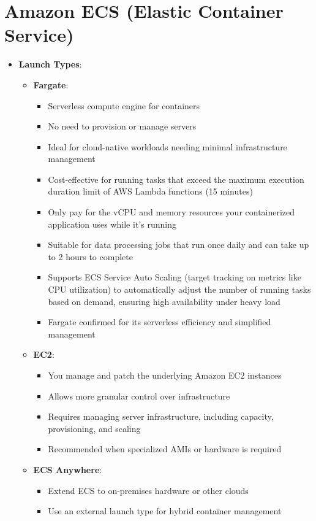 \documentclass[11pt,a4paper]{report}
\begin{document}
\section{Amazon ECS (Elastic Container Service)}

\begin{itemize}
  \item \textbf{Launch Types}:
\begin{itemize}
  \item \textbf{Fargate}:
\begin{itemize}
  \item Serverless compute engine for containers
  \item No need to provision or manage servers
  \item Ideal for cloud-native workloads needing minimal infrastructure management
  \item Cost-effective for running tasks that exceed the maximum execution duration limit of AWS Lambda functions (15 minutes)
  \item Only pay for the vCPU and memory resources your containerized application uses while it's running
  \item Suitable for data processing jobs that run once daily and can take up to 2 hours to complete
  \item Supports ECS Service Auto Scaling (target tracking on metrics like CPU utilization) to automatically adjust the number of running tasks based on demand, ensuring high availability under heavy load
  \item Fargate confirmed for its serverless efficiency and simplified management
\end{itemize}
  \item \textbf{EC2}:
\begin{itemize}
  \item You manage and patch the underlying Amazon EC2 instances
  \item Allows more granular control over infrastructure
  \item Requires managing server infrastructure, including capacity, provisioning, and scaling
  \item Recommended when specialized AMIs or hardware is required
\end{itemize}
  \item \textbf{ECS Anywhere}:
\begin{itemize}
  \item Extend ECS to on-premises hardware or other clouds
  \item Use an external launch type for hybrid container management

\end{itemize}
\end{itemize}
\end{itemize}
\end{document}
